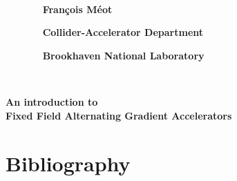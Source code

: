 \documentclass[12pt]{article}
\newcommand{\blue}{\color{blue}}
\begin{document}
\landscape


\sffamily


  
~~~~~~

~~~~~~~{~~ \Large

~~~~~~~ \hfill    \bf Fran\c{c}ois M\'eot

~~~~~~~ \hfill    \bf Collider-Accelerator Department

~~~~~~~ \hfill    \bf Brookhaven National Laboratory
}

~~~~~~~~~~~~~~~~~~~~~~~~~

\vspace{50mm}

\begin{center} 
\fontsize{34}{0} \selectfont
  \blue
\bf An introduction to \\[4ex]
\bf Fixed Field Alternating Gradient Accelerators
\end{center} 






\clearpage 

\tableofcontents



\clearpage

\section*{\LARGE Bibliography}
\end{document}

